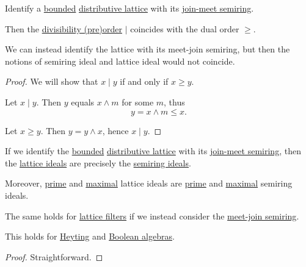 \begin{proposition}\label{thm:lattice_divisibility}
  Identify a \hyperref[def:extremal_points/bounds]{bounded} \hyperref[def:distributive_lattice]{distributive lattice} with its \hyperref[ex:def:semiring/lattice]{join-meet semiring}.

  Then the \hyperref[thm:semiring_divisibility_order]{divisibility (pre)order} \( \mid \) coincides with the dual order \( \geq \).
\end{proposition}
\begin{comments}
  \item We can instead identify the lattice with its meet-join semiring, but then the notions of semiring ideal and lattice ideal would not coincide.
\end{comments}
\begin{proof}
  We will show that \( x \mid y \) if and only if \( x \geq y \).

  \SufficiencySubProof Let \( x \mid y \). Then \( y \) equals \( x \wedge m \) for some \( m \), thus
  \begin{equation*}
    y = x \wedge m \leq x.
  \end{equation*}

  \NecessitySubProof Let \( x \geq y \). Then \( y = y \wedge x \), hence \( x \mid y \).
\end{proof}

\begin{proposition}\label{thm:lattice_ideal_as_semiring_ideal}
  If we identify the \hyperref[def:extremal_points/bounds]{bounded} \hyperref[def:distributive_lattice]{distributive lattice} with its \hyperref[ex:def:semiring/lattice]{join-meet semiring}, then the \hyperref[def:lattice_ideal]{lattice ideals} are precisely the \hyperref[def:semiring_ideal]{semiring ideals}.

  Moreover, \hyperref[def:lattice_ideal/prime]{prime} and \hyperref[def:lattice_ideal/maximal]{maximal} lattice ideals are \hyperref[def:semiring_ideal/prime]{prime} and \hyperref[def:semiring_ideal/maximal]{maximal} semiring ideals.
\end{proposition}
\begin{comments}
  \item The same holds for \hyperref[def:lattice_ideal]{lattice filters} if we instead consider the \hyperref[ex:def:semiring/lattice]{meet-join semiring}.

  \item This holds for \hyperref[def:heyting_algebra]{Heyting} and \hyperref[def:boolean_algebra]{Boolean algebras}.
\end{comments}
\begin{proof}
  Straightforward.
\end{proof}

